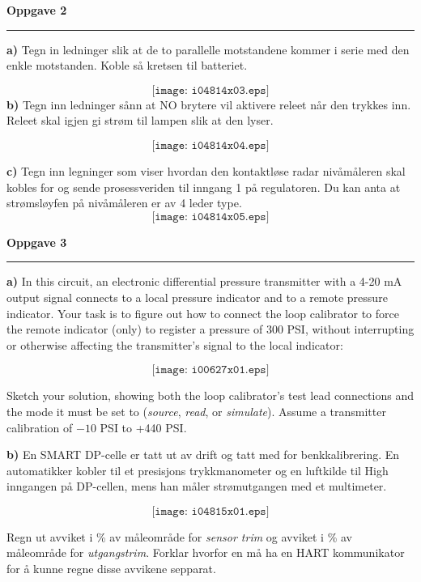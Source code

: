 \vskip 5pt 
\filbreak


\vfil \eject
\textbf{Oppgave 2}
\vskip 5pt
\hrule

\vskip 5pt
\textbf{a)} Tegn in ledninger slik at de to parallelle motstandene kommer i serie med den enkle motstanden. Koble så kretsen til batteriet.

$$\texttt{[image: i04814x03.eps]}$$
\vskip 1cm
\vfil \eject
\textbf{b)} Tegn inn ledninger sånn at NO brytere vil aktivere releet når den trykkes inn. Releet skal igjen gi strøm til lampen slik at den lyser.

$$\texttt{[image: i04814x04.eps]}$$

\vskip 1cm
\filbreak
\textbf{c)} Tegn inn legninger som viser hvordan den kontaktløse radar nivåmåleren skal kobles for og sende prosessveriden til inngang 1 på regulatoren. Du kan anta at strømsløyfen på nivåmåleren er av 4 leder type.
$$\texttt{[image: i04814x05.eps]}$$

\vfil \eject
\textbf{Oppgave 3}
\vskip 5pt
\hrule
\vskip 5pt

\textbf{a)} In this circuit, an electronic differential pressure transmitter with a 4-20 mA output signal connects to a local pressure indicator and to a remote pressure indicator.  Your task is to figure out how to connect the loop calibrator to force the remote indicator (only) to register a pressure of 300 PSI, without interrupting or otherwise affecting the transmitter's signal to the local indicator:

$$\texttt{[image: i00627x01.eps]}$$

Sketch your solution, showing both the loop calibrator's test lead connections and the mode it must be set to ({\it source}, {\it read}, or {\it simulate}).  Assume a transmitter calibration of $-10$ PSI to +440 PSI.

\vfil

\textbf{b) }En SMART DP-celle er tatt ut av drift og tatt med for benkkalibrering. En automatikker kobler til et presisjons trykkmanometer og en luftkilde til High inngangen på DP-cellen, mens han måler strømutgangen med et multimeter. 

$$\texttt{[image: i04815x01.eps]}$$

Regn ut avviket i \% av måleområde for {\it sensor trim} og avviket i  \% av måleområde for {\it utgangstrim}.  Forklar hvorfor en må ha en HART kommunikator for å kunne regne disse avvikene sepparat. 


